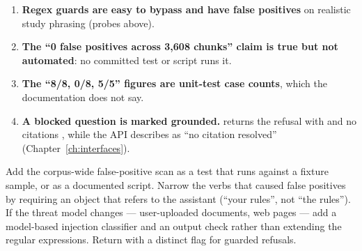 \begin{enumerate}
  \item \textbf{Regex guards are easy to bypass and have false positives} on realistic study phrasing (probes above). \tagM
  \item \textbf{The \enquote{0 false positives across 3,608 chunks} claim is true but not automated}: no committed test or script runs it. \tagV
  \item \textbf{The \enquote{8/8, 0/8, 5/5} figures are unit-test case counts}, which the documentation does not say. \tagV
  \item \textbf{A blocked question is marked grounded.}  returns the refusal with  and no citations , while the API describes  as \enquote{no citation resolved} (Chapter~\ref{ch:interfaces}). \tagV
\end{enumerate}

\begin{recommended}
Add the corpus-wide false-positive scan as a test that runs against a fixture sample, or as a documented script. Narrow the verbs that caused false positives by requiring an object that refers to the assistant (\enquote{your rules}, not \enquote{the rules}). If the threat model changes --- user-uploaded documents, web pages --- add a model-based injection classifier and an output check rather than extending the regular expressions. Return  with a distinct  flag for guarded refusals.
\end{recommended}
